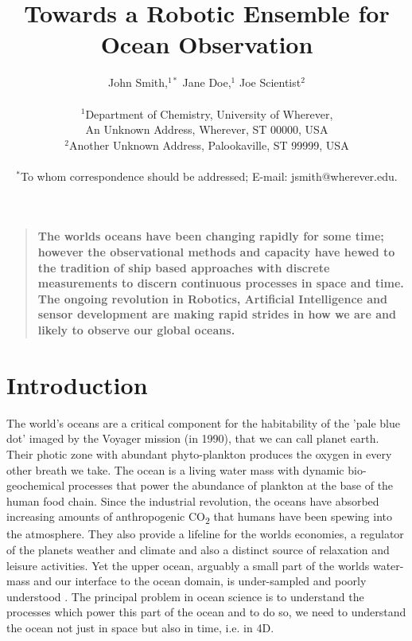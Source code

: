 \documentclass[12pt]{article}
\title{Towards a Robotic Ensemble for Ocean Observation}
\author
{John Smith,$^{1\ast}$ Jane Doe,$^{1}$ Joe Scientist$^{2}$\\
\\
\normalsize{$^{1}$Department of Chemistry, University of Wherever,}\\
\normalsize{An Unknown Address, Wherever, ST 00000, USA}\\
\normalsize{$^{2}$Another Unknown Address, Palookaville, ST 99999, USA}\\
\\
\normalsize{$^\ast$To whom correspondence should be addressed; E-mail:  jsmith@wherever.edu.}
}
\date{}
\newenvironment{sciabstract}{%
\begin{quote} \bf}
{\end{quote}}
\begin{document}
\baselineskip24pt


\maketitle 


\begin{sciabstract}
  The worlds oceans have been changing rapidly for some time; however
  the observational methods and capacity have hewed to the tradition
  of ship based approaches with discrete measurements to discern
  continuous processes in space and time.  The ongoing revolution in
  Robotics, Artificial Intelligence and sensor development are making
  rapid strides in how we are and likely to observe our global
  oceans. 
  
  
\end{sciabstract}



\section{Introduction}

The world's oceans are a critical component for the habitability of
the 'pale blue dot' imaged by the Voyager mission (in 1990), that we
can call planet earth. Their photic zone with abundant phyto-plankton
produces the oxygen in every other breath we take. The ocean is a
living water mass with dynamic bio-geochemical processes that power
the abundance of plankton at the base of the human food chain.  Since
the industrial revolution, the oceans have absorbed increasing amounts
of anthropogenic CO\textsubscript{2} that humans have been spewing
into the atmosphere. They also provide a lifeline for the worlds
economies, a regulator of the planets weather and climate and also a
distinct source of relaxation and leisure activities. Yet the upper
ocean, arguably a small part of the worlds water-mass and our
interface to the ocean domain, is under-sampled and poorly understood
\cite{munk2002}. The principal problem in ocean science is to
understand the processes which power this part of the ocean and to do so,
we need to understand the ocean not just in space but also in time,
i.e. in 4D. 
\end{document}
